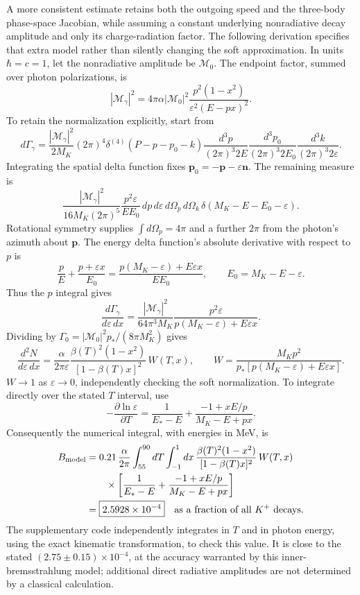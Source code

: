A more consistent estimate retains both the outgoing speed and the
three-body phase-space Jacobian, while assuming a constant underlying
nonradiative decay amplitude and only its charge-radiation factor.
The following derivation specifies that extra model rather than
silently changing the soft approximation.  In units $\hbar=c=1$,
let the nonradiative amplitude be $\mathcal M_0$.  The endpoint
factor, summed over photon polarizations, is
\[
|\mathcal M_\gamma|^2=4\pi\alpha|\mathcal M_0|^2
 \frac{p^2(1-x^2)}{\varepsilon^2(E-px)^2}.
\]
To retain the normalization explicitly, start from
\[
d\Gamma_\gamma=\frac{|\mathcal M_\gamma|^2}{2M_K}(2\pi)^4
 \delta^{(4)}(P-p-p_0-k)
 \frac{d^3p}{(2\pi)^3 2E}
 \frac{d^3p_0}{(2\pi)^3 2E_0}
 \frac{d^3k}{(2\pi)^3 2\varepsilon}.
\]
Integrating the spatial delta function fixes
$\mathbf p_0=-\mathbf p-\varepsilon\mathbf n$.  The remaining
measure is
\[
\frac{|\mathcal M_\gamma|^2}{16M_K(2\pi)^5}
 \frac{p^2\varepsilon}{EE_0}\,
 dp\,d\varepsilon\,d\Omega_p\,d\Omega_k\,
 \delta(M_K-E-E_0-\varepsilon).
\]
Rotational symmetry supplies $\int d\Omega_p=4\pi$ and a further
$2\pi$ from the photon's azimuth about $\mathbf p$.
The energy delta function's absolute derivative with respect to $p$ is
\[
\frac pE+\frac{p+\varepsilon x}{E_0}
=\frac{p(M_K-\varepsilon)+E\varepsilon x}{EE_0},
\qquad E_0=M_K-E-\varepsilon.
\]
Thus the $p$ integral gives
\[
\frac{d\Gamma_\gamma}{d\varepsilon\,dx}
=\frac{|\mathcal M_\gamma|^2}{64\pi^3M_K}
 \frac{p^2\varepsilon}{p(M_K-\varepsilon)+E\varepsilon x}.
\]
Dividing by $\Gamma_0=|\mathcal M_0|^2p_* /(8\pi M_K^2)$ gives
\[
\frac{d^2N}{d\varepsilon\,dx}
=\frac{\alpha}{2\pi\varepsilon}
\frac{\beta(T)^2(1-x^2)}{[1-\beta(T)x]^2}\,
W(T,x),\qquad
W=\frac{M_Kp^2}{p_*[p(M_K-\varepsilon)+E\varepsilon x]}.
\]
$W\to1$ as $\varepsilon\to0$, independently checking the soft
normalization.  To integrate directly over the stated $T$ interval,
use
\[
-\frac{\partial\ln\varepsilon}{\partial T}
=\frac1{E_*-E}+\frac{-1+xE/p}{M_K-E+px}.
\]
Consequently the numerical integral, with energies in MeV, is
\begin{align*}
B_{\rm model}
&=0.21\,\frac{\alpha}{2\pi}
 \int_{55}^{90}dT\int_{-1}^{1}dx\,
 \frac{\beta(T)^2(1-x^2)}{[1-\beta(T)x]^2}\,W(T,x)\\
&\qquad\times\left[\frac1{E_*-E}
 +\frac{-1+xE/p}{M_K-E+px}\right]\\
&=\boxed{2.5928\times10^{-4}}
 \quad\hbox{as a fraction of all }K^+\hbox{ decays}.
\end{align*}
The supplementary code independently integrates in $T$ and in photon
energy, using the exact kinematic transformation, to check this value.
It is close to the stated $(2.75\pm0.15)\times10^{-4}$, at the
accuracy warranted by this inner-bremsstrahlung model; additional
direct radiative amplitudes are not determined by a classical
calculation.

